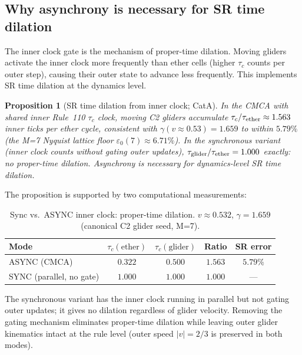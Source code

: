 \documentclass[11pt]{article}
\newtheorem{proposition}[theorem]{Proposition}
\theoremstyle{remark}
\newcommand{\epsz}{\varepsilon_0}
\begin{document}
\subsection{Why asynchrony is necessary for SR time dilation}
\label{ssec:async_necessary}

The inner clock gate is the mechanism of proper-time dilation.  Moving gliders
activate the inner clock more frequently than ether cells (higher $\tau_c$
counts per outer step), causing their outer state to advance less frequently.
This implements SR time dilation at the dynamics level.

\begin{proposition}[SR time dilation from inner clock; CatA]
\label{prop:sr_dilation}
In the CMCA with shared inner Rule~110 $\tau_c$ clock, moving C2 gliders
accumulate $\tau_c/\tau_{\rm ether} \approx 1.563$ inner ticks per ether cycle,
consistent with $\gamma(v\approx0.53) = 1.659$ to within $5.79\%$ (the M=7
Nyquist lattice floor $\epsz(7)\approx6.71\%$).
In the synchronous variant (inner clock counts without gating outer updates),
$\tau_{\rm glider}/\tau_{\rm ether} = 1.000$ exactly: no proper-time dilation.
\emph{Asynchrony is necessary for dynamics-level SR time dilation.}
\end{proposition}

The proposition is supported by two computational measurements:

\begin{table}[h]
  \centering
  \small
  \caption{Sync vs.\ ASYNC inner clock: proper-time dilation.
    $v \approx 0.532$, $\gamma = 1.659$ (canonical C2 glider seed, M=7).}
  \label{tab:sync_async}
  \begin{tabular}{lcccc}
    \toprule
    Mode & $\tau_c(\text{ether})$ & $\tau_c(\text{glider})$
         & Ratio & SR error \\
    \midrule
    ASYNC (CMCA) & $0.322$ & $0.500$ & $\mathbf{1.563}$ & $\mathbf{5.79\%}$ \\
    SYNC (parallel, no gate) & $1.000$ & $1.000$ & $1.000$ & --- \\
    \bottomrule
  \end{tabular}
\end{table}

The synchronous variant has the inner clock running in parallel but not
gating outer updates; it gives no dilation regardless of glider velocity.
Removing the gating mechanism eliminates proper-time dilation while leaving
outer glider kinematics intact at the rule level (outer speed $|v|=2/3$
is preserved in both modes).
\end{document}
